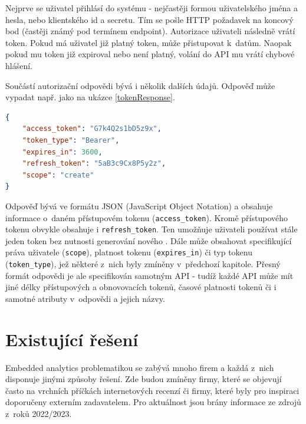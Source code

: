 \documentclass[czech, bc, kiv, he, iso690numb]{fasthesis}
\begin{document}
Nejprve se uživatel přihlásí do systému - nejčastěji formou uživatelského jména a hesla, nebo klientského id a secretu. Tím se pošle HTTP požadavek na koncový bod (častěji známý pod termínem endpoint). 
Autorizace uživateli následně vrátí token. Pokud má uživatel již platný token, může přistupovat k~datům. Naopak pokud mu token již expiroval nebo není platný, volání do API mu vrátí chybové hlášení. 

Součástí autorizační odpovědi bývá i několik dalších údajů. Odpověď může vypadat např. jako na ukázce \ref{tokenResponse}. 

\begin{minipage}[c]{0.95\textwidth}
\begin{lstlisting}[language=json, caption={Ukázková odpověď autorizačního serveru}, label=tokenResponse]
{
	"access_token": "G7k4Q2s1bD5z9x",
	"token_type": "Bearer",
	"expires_in": 3600,
	"refresh_token": "5aB3c9Cx8P5y2z",
	"scope": "create"
}
\end{lstlisting}
\end{minipage}

Odpověď bývá ve formátu JSON (JavaScript Object Notation) a obsahuje informace o~daném přístupovém tokenu (\texttt{access\_token}). Kromě přístupového tokenu obvykle obsahuje i \texttt{refresh\_token}. Ten umožňuje uživateli 
používat stále jeden token bez nutnosti generování nového \cite{oauthResponseExample}. Dále může obsahovat specifikující práva uživatele (\texttt{scope}), platnost tokenu (\texttt{expires\_in}) či typ tokenu (\texttt{token\_type}), jež některé z~nich byly zmíněny v~předchozí kapitole.
Přesný formát odpovědi je ale specifikován samotným API - tudíž každé API může mít jiné délky přístupových a obnovovacích tokenů, časové platnosti tokenů či i samotné atributy v~odpovědi a jejich názvy.
%
%
\section{Existující řešení}
Embedded analytics problematikou se zabývá mnoho firem a každá z~nich disponuje jinými způsoby řešení. Zde budou zmíněny firmy, které se objevují často na vrchních příčkách
internetových recenzí či firmy, které byly pro inspiraci doporučeny externím zadavatelem. Pro aktuálnost jsou brány informace ze zdrojů z~roků 2022/2023.
\end{document}
